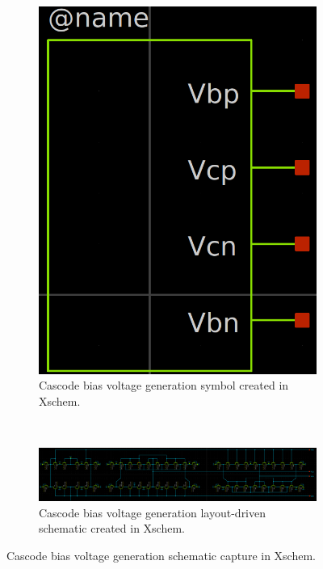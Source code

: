 \documentclass[11pt]{article}
\begin{document}
    \begin{figure}[!ht]
        \centering
        \begin{subfigure}{\linewidth}
            \centering
            \includegraphics[width=0.2\linewidth]{../img/bias_sym.png}
            \caption{Cascode bias voltage generation symbol created in Xschem.}
        \end{subfigure}\\
        \begin{subfigure}{1.0\linewidth}
            \includegraphics[width=\linewidth]{../img/bias_sch.png}
            \caption{Cascode bias voltage generation layout-driven schematic created in Xschem.}
        \end{subfigure}
        \caption{Cascode bias voltage generation schematic capture in Xschem.}
        \label{fig:bias_schm}
    \end{figure}
\end{document}

